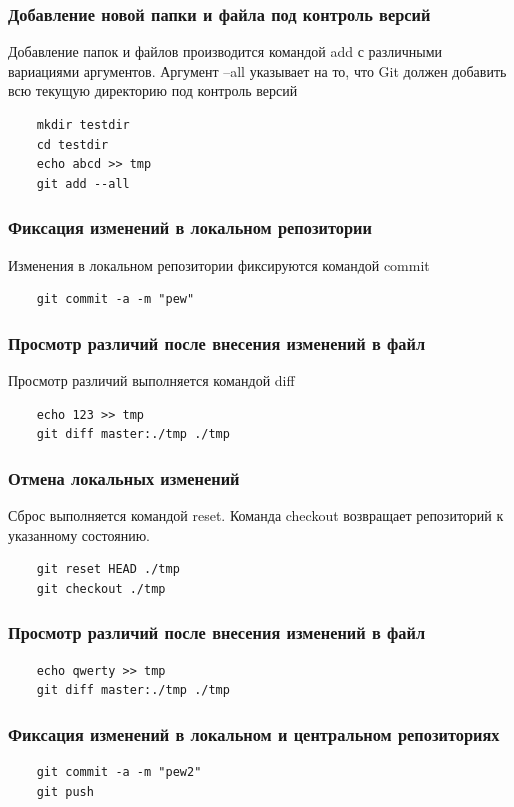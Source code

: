 \documentclass[a4paper, 14pt]{article}				%
\begin{document}
\subsubsection{Добавление новой папки и файла под контроль версий}
Добавление папок и файлов производится командой add с различными вариациями аргументов. Аргумент --all указывает на то, что Git должен добавить всю текущую директорию под контроль версий
\begin{verbatim}
	mkdir testdir
	cd testdir
	echo abcd >> tmp
	git add --all
\end{verbatim}

\subsubsection{Фиксация изменений в локальном репозитории}
Изменения в локальном репозитории фиксируются командой commit
\begin{verbatim}
	git commit -a -m "pew"
\end{verbatim}

\subsubsection{Просмотр различий после внесения изменений в файл}
Просмотр различий выполняется командой diff
\begin{verbatim}
	echo 123 >> tmp
	git diff master:./tmp ./tmp
\end{verbatim}

\subsubsection{Отмена локальных изменений}
Сброс выполняется командой reset. Команда checkout возвращает репозиторий к указанному состоянию.
\begin{verbatim}
	git reset HEAD ./tmp
	git checkout ./tmp
\end{verbatim}

\subsubsection{Просмотр различий после внесения изменений в файл}
\begin{verbatim}
	echo qwerty >> tmp
	git diff master:./tmp ./tmp
\end{verbatim}

\subsubsection{Фиксация изменений в локальном и центральном репозиториях}
\begin{verbatim}
	git commit -a -m "pew2"
	git push
\end{verbatim}
\end{document}
